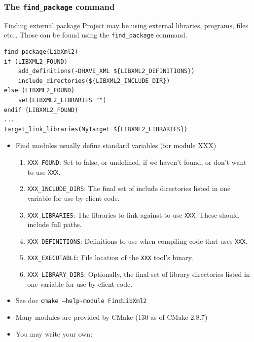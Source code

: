 \documentclass[compress,slidestop,table
              ]
               {beamer}
\newcommand{\fname}[1]{\texttt{#1}}
\begin{document}
\begin{frame}
\frametitle{The \lstinline!find_package! command}
\begin{block}{Finding external package}
Project may be using external libraries, programs, files etc\ldots
Those can be found using the \lstinline!find_package! command.
\end{block}
\begin{lstlisting}[basicstyle=\scriptsize,caption=using libxml2]
find_package(LibXml2)
if (LIBXML2_FOUND)
    add_definitions(-DHAVE_XML ${LIBXML2_DEFINITIONS})
    include_directories(${LIBXML2_INCLUDE_DIR})
else (LIBXML2_FOUND)
    set(LIBXML2_LIBRARIES "")
endif (LIBXML2_FOUND)
...
target_link_libraries(MyTarget ${LIBXML2_LIBRARIES})
\end{lstlisting}
\begin{itemize}
\item Find modules usually define standard variables (for module XXX)
     \begin{enumerate}
     \item \fname{XXX\_FOUND}: Set to false, or undefined, if we haven't found, or don't want to use \fname{XXX}.
     \item \fname{XXX\_INCLUDE\_DIRS}: The final set of include directories listed in one variable for use by client code.
     \item \fname{XXX\_LIBRARIES}: The libraries to link against to use \fname{XXX}.
           These should include full paths.
     \item \fname{XXX\_DEFINITIONS}: Definitions to use when compiling code that uses \fname{XXX}.
     \item \fname{XXX\_EXECUTABLE}: File location of the \fname{XXX} tool's binary.
     \item \fname{XXX\_LIBRARY\_DIRS}: Optionally, the final set of library directories listed in one variable for use by client code.
     \end{enumerate}
\item See doc \fname{cmake --help-module FindLibXml2}
\item Many modules are provided by CMake (130 as of CMake 2.8.7)
\item You may write your own:


\end{itemize}
\end{frame}
\end{document}

